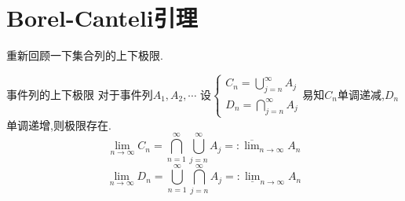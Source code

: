 \section{Borel-Canteli引理}
重新回顾一下集合列的上下极限.
\begin{definition}{事件列的上下极限}{}
    对于事件列$A_1,A_2,\cdots$
    设$\left\{\begin{aligned}C_n=\bigcup_{j=n}^{\infty}A_j\\D_n=\bigcap_{j=n}^{\infty}A_j\end{aligned}\right.$易知$C_n$单调递减,$D_n$单调递增,则极限存在.
   $$\lim_{n\to\infty}C_n=\bigcap_{n=1}^{\infty}\bigcup_{j=n}^{\infty}A_j=:\overline{\lim}_{n\to \infty}A_n$$ 
   $$\lim_{n\to\infty}D_n=\bigcup_{n=1}^{\infty}\bigcap_{j=n}^{\infty}A_j=:\underline{\lim}_{n\to\infty}A_n$$
\end{definition}

